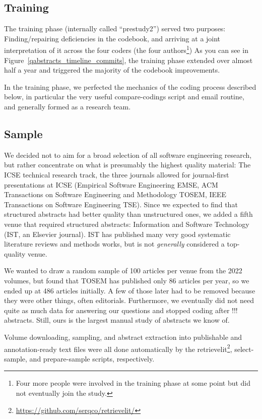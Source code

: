 \documentclass[10pt,journal,compsoc]{IEEEtran}
\newcommand{\Prg}[1]{\bgroup\ttfamily #1\egroup}  %
\begin{document}
\subsection{Training}\label{meth_training}

The training phase (internally called ``prestudy2'') served two purposes:
Finding/repairing deficiencies in the codebook,
and arriving at a joint interpretation of it across the four coders 
(the four authors\footnote{Four more people were involved in the training phase at some
  point but did not eventually join the study.})
As you can see in Figure~\ref{qabstracts_timeline_commits},
the training phase extended over almost half a year and triggered
the majority of the codebook improvements.

In the training phase, we perfected the mechanics of the coding process
described below, in particular the very useful \Prg{compare-codings} script
and email routine,
and generally formed as a research team.


\subsection{Sample}\label{meth_sample}

We decided not to aim for a broad selection of all software engineering research,
but rather concentrate on what is presumably the highest quality material:
The ICSE technical research track,
the three journals allowed for journal-first presentations at ICSE
(Empirical Software Engineering EMSE, 
ACM Transactions on Software Engineering and Methodology TOSEM, 
IEEE Transactions on Software Engineering TSE).
Since we expected to find that structured abstracts had better quality
than unstructured ones, we added a fifth venue that required structured abstracts:
Information and Software Technology (IST, an Elsevier journal).
IST has published many very good systematic literature reviews and methods works,
but is not \emph{generally} considered a top-quality venue.

We wanted to draw a random sample of 100 articles per venue from the
2022 volumes, but found that TOSEM has published only 86 articles per year,
so we ended up at 486 articles initially.
A few of those later had to be removed because they were other things,
often editorials.
Furthermore, we eventually did not need quite as much data for answering our
questions and stopped coding after !!! abstracts.
Still, ours is the largest manual study of abstracts we know of.

Volume downloading, sampling, and abstract extraction into publishable
and annotation-ready text files were all done automatically by the
retrievelit\footnote{\url{https://github.com/serqco/retrievelit/}},
select-sample, and prepare-sample scripts, respectively.
\end{document}

